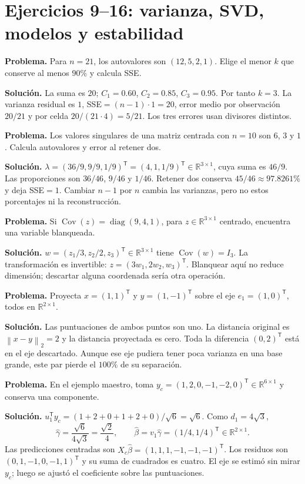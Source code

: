 \documentclass[11pt,a4paper]{article}
\newcommand{\R}{\mathbb R}
\newcommand{\T}{^{\mathsf T}}
\newcommand{\norm}[1]{\left\lVert #1\right\rVert}
\DeclareMathOperator{\Cov}{Cov}
\DeclareMathOperator{\diag}{diag}
\theoremstyle{definition}
\begin{document}
\section{Ejercicios 9--16: varianza, SVD, modelos y estabilidad}
\begin{ejemplo}
\textbf{Problema.} Para $n=21$, los autovalores son $(12,5,2,1)$. Elige el menor $k$ que conserve al menos $90\%$ y calcula SSE.

\textbf{Solución.} La suma es $20$; $C_1=0.60$, $C_2=0.85$, $C_3=0.95$. Por tanto $k=3$. La varianza residual es $1$, SSE$=(n-1)\cdot1=20$, error medio por observación $20/21$ y por celda $20/(21\cdot4)=5/21$. Los tres errores usan divisores distintos.
\end{ejemplo}
\begin{ejemplo}
\textbf{Problema.} Los valores singulares de una matriz centrada con $n=10$ son $6$, $3$ y $1$. Calcula autovalores y error al retener dos.

\textbf{Solución.} $\lambda=(36/9,9/9,1/9)\T=(4,1,1/9)\T\in\R^{3\times1}$, cuya suma es $46/9$. Las proporciones son $36/46$, $9/46$ y $1/46$. Retener dos conserva $45/46\approx97.8261\%$ y deja SSE$=1$. Cambiar $n-1$ por $n$ cambia las varianzas, pero no estos porcentajes ni la reconstrucción.
\end{ejemplo}
\begin{ejemplo}
\textbf{Problema.} Si $\Cov(z)=\diag(9,4,1)$, para $z\in\R^{3\times1}$ centrado, encuentra una variable blanqueada.

\textbf{Solución.} $w=(z_1/3,z_2/2,z_3)\T\in\R^{3\times1}$ tiene $\Cov(w)=I_3$. La transformación es invertible: $z=(3w_1,2w_2,w_3)\T$. Blanquear aquí no reduce dimensión; descartar alguna coordenada sería otra operación.
\end{ejemplo}
\begin{ejemplo}
\textbf{Problema.} Proyecta $x=(1,1)\T$ y $y=(1,-1)\T$ sobre el eje $e_1=(1,0)\T$, todos en $\R^{2\times1}$.

\textbf{Solución.} Las puntuaciones de ambos puntos son uno. La distancia original es $\norm{x-y}_2=2$ y la distancia proyectada es cero. Toda la diferencia $(0,2)\T$ está en el eje descartado. Aunque ese eje pudiera tener poca varianza en una base grande, este par pierde el $100\%$ de su separación.
\end{ejemplo}
\begin{ejemplo}
\textbf{Problema.} En el ejemplo maestro, toma $y_c=(1,2,0,-1,-2,0)\T\in\R^{6\times1}$ y conserva una componente.

\textbf{Solución.} $u_1\T y_c=(1+2+0+1+2+0)/\sqrt6=\sqrt6$. Como $d_1=4\sqrt3$,
\[
\widehat\gamma=\frac{\sqrt6}{4\sqrt3}=\frac{\sqrt2}{4},\qquad
\widehat\beta=v_1\widehat\gamma=(1/4,1/4)\T\in\R^{2\times1}.
\]
Las predicciones centradas son $X_c\widehat\beta=(1,1,1,-1,-1,-1)\T$. Los residuos son $(0,1,-1,0,-1,1)\T$ y su suma de cuadrados es cuatro. El eje se estimó sin mirar $y_c$; luego se ajustó el coeficiente sobre las puntuaciones.
\end{ejemplo}
\end{document}
